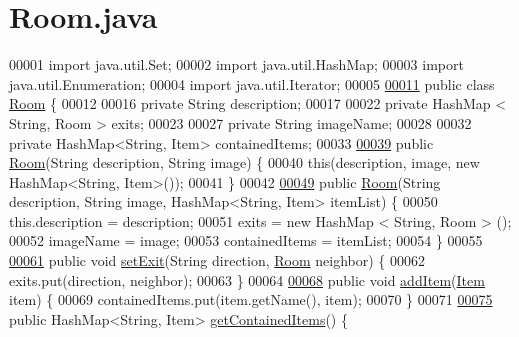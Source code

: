 \hypertarget{Room_8java_source}{\section{Room.\-java}
}

\begin{DoxyCode}
00001 \textcolor{keyword}{import} java.util.Set;
00002 \textcolor{keyword}{import} java.util.HashMap;
00003 \textcolor{keyword}{import} java.util.Enumeration;
00004 \textcolor{keyword}{import} java.util.Iterator;
00005 
\hypertarget{Room_8java_source_l00011}{}\hyperlink{classRoom}{00011} \textcolor{keyword}{public} \textcolor{keyword}{class }\hyperlink{classRoom}{Room} \{
00012 
00016     \textcolor{keyword}{private} String description;
00017 
00022     \textcolor{keyword}{private} HashMap < String, Room > exits;
00023 
00027     \textcolor{keyword}{private} String imageName;
00028 
00032     \textcolor{keyword}{private} HashMap<String, Item> containedItems;
00033 
\hypertarget{Room_8java_source_l00039}{}\hyperlink{classRoom_a2cdcbb3d86746330a5a01c7fae4de02c}{00039}     \textcolor{keyword}{public} \hyperlink{classRoom_a2cdcbb3d86746330a5a01c7fae4de02c}{Room}(String description, String image) \{
00040         \textcolor{keyword}{this}(description, image, \textcolor{keyword}{new} HashMap<String, Item>());
00041     \}
00042 
\hypertarget{Room_8java_source_l00049}{}\hyperlink{classRoom_a05e162f8831368304aa193ad5a05750c}{00049}     \textcolor{keyword}{public} \hyperlink{classRoom_a05e162f8831368304aa193ad5a05750c}{Room}(String description, String image, HashMap<String, Item> itemList) \{
00050         this.description = description;
00051         exits = \textcolor{keyword}{new} HashMap < String, Room > ();
00052         imageName = image;
00053         containedItems = itemList;
00054     \}
00055 
\hypertarget{Room_8java_source_l00061}{}\hyperlink{classRoom_ae4bc6837f331b5249beb0651fc277018}{00061}     \textcolor{keyword}{public} \textcolor{keywordtype}{void} \hyperlink{classRoom_ae4bc6837f331b5249beb0651fc277018}{setExit}(String direction, \hyperlink{classRoom}{Room} neighbor) \{
00062         exits.put(direction, neighbor);
00063     \}
00064 
\hypertarget{Room_8java_source_l00068}{}\hyperlink{classRoom_a0b4fcc1c1c04e60efa7ae5f82ea37157}{00068}     \textcolor{keyword}{public} \textcolor{keywordtype}{void} \hyperlink{classRoom_a0b4fcc1c1c04e60efa7ae5f82ea37157}{addItem}(\hyperlink{classItem}{Item} item) \{
00069         containedItems.put(item.getName(), item);
00070     \}
00071 
\hypertarget{Room_8java_source_l00075}{}\hyperlink{classRoom_a4d50f61fe592736e56e9e083b124ff83}{00075}     \textcolor{keyword}{public} HashMap<String, Item> \hyperlink{classRoom_a4d50f61fe592736e56e9e083b124ff83}{getContainedItems}() \{

\end{DoxyCode}
